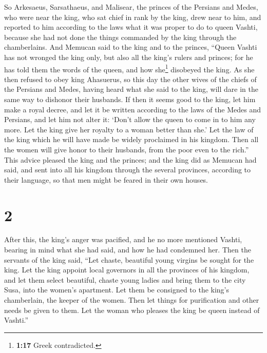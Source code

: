  So Arkesaeus, Sarsathaeus, and Malisear, the princes of
the Persians and Medes, who were near the king, who sat chief in rank by
the king, drew near to him,  and reported to him
according to the laws what it was proper to do to queen Vashti, because
she had not done the things commanded by the king through the
chamberlains.  And Memucan said to the king and to the
princes, ``Queen Vashti has not wronged the king only, but also all the
king's rulers and princes;  for he has told them the
words of the queen, and how she\footnote{\textbf{1:17} Greek
  contradicted.} disobeyed the king. As she then refused to obey king
Ahasuerus,  so this day the other wives of the chiefs of
the Persians and Medes, having heard what she said to the king, will
dare in the same way to dishonor their husbands.  If then
it seems good to the king, let him make a royal decree, and let it be
written according to the laws of the Medes and Persians, and let him not
alter it: `Don't allow the queen to come in to him any more. Let the
king give her royalty to a woman better than she.'  Let
the law of the king which he will have made be widely proclaimed in his
kingdom. Then all the women will give honor to their husbands, from the
poor even to the rich.''  This advice pleased the king
and the princes; and the king did as Memucan had said, 
and sent into all his kingdom through the several provinces, according
to their language, so that men might be feared in their own houses.

\hypertarget{section-1}{%
\section{2}\label{section-1}}

 After this, the king's anger was pacified, and he no more
mentioned Vashti, bearing in mind what she had said, and how he had
condemned her.  Then the servants of the king said, ``Let
chaste, beautiful young virgins be sought for the king. 
Let the king appoint local governors in all the provinces of his
kingdom, and let them select beautiful, chaste young ladies and bring
them to the city Susa, into the women's apartment. Let them be consigned
to the king's chamberlain, the keeper of the women. Then let things for
purification and other needs be given to them.  Let the
woman who pleases the king be queen instead of Vashti.''

